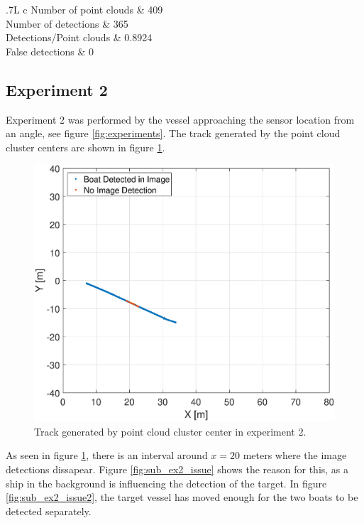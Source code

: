 \begin{table}[H]
	\centering
	\begin{tabularx}{.7\linewidth}{L c}
		\toprule
		Number of point clouds & 409\\
		\midrule
		Number of detections & 365\\
		\midrule
	    Detections/Point clouds & 0.8924 \\
	    \midrule
	    False detections & 0\\
		\bottomrule
	\end{tabularx}
\caption{Data from experiment 1.}
\label{tab:exp1}
\end{table}
\subsection{Experiment 2}
Experiment 2 was performed by the vessel approaching the sensor location from an angle, see figure \ref{fig:experiments}. The track generated by the point cloud cluster centers are shown in figure \ref{fig:ex2_track}.
\begin{figure}[H]
	\centering
	\includegraphics[width=.8\linewidth]{fig/exp_2_track.eps}
	\caption{Track generated by point cloud cluster center in experiment 2.}
	\label{fig:ex2_track}
\end{figure}
As seen in figure \ref{fig:ex2_track}, there is an interval around $x=20$ meters where the image detections dissapear. Figure \ref{fig:sub_ex2_issue} shows the reason for this, as a ship in the background is influencing the detection of the target. In figure \ref{fig:sub_ex2_issue2}, the target vessel has moved enough for the two boats to be detected separately.
